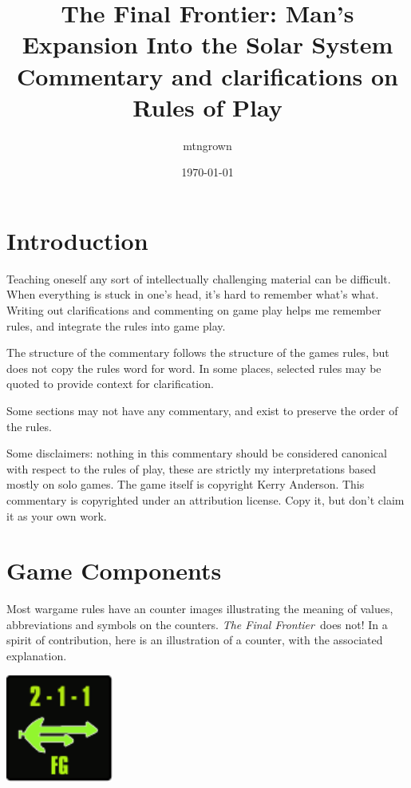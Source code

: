\documentclass[10pt]{article}
\title{The Final Frontier: Man's Expansion Into the Solar System\\
\vspace{2 mm} {\Large Commentary and clarifications on Rules of Play}}
\date{\today}
\author{mtngrown}
\def\tff{{\em The Final Frontier}}
\begin{document}
\maketitle
\tableofcontents


\begin{multicols}{2}

\section{Introduction}

Teaching oneself any sort of intellectually challenging material can be
difficult. When everything is stuck in one's head, it's hard to remember
what's what. Writing out clarifications and commenting on game play helps
me remember rules, and integrate the rules into game play.

The structure of the commentary follows the structure of the games rules,
but does not copy the rules word for word. In some places, selected rules may
be quoted to provide context for clarification.

Some sections may not have any commentary, and exist to preserve the order
of the rules.

Some disclaimers: nothing in this commentary should be considered canonical
with respect to the rules of play, these are strictly my interpretations based
mostly on solo games. The game itself is copyright Kerry Anderson. This
commentary is copyrighted under an attribution license. Copy it, but don't
claim it as your own work.


\section{Game Components}

Most wargame rules have an counter images illustrating the meaning of values,
abbreviations and symbols on the counters. \tff\ does not! In a
spirit of contribution, here is an illustration of a counter, with the associated
explanation.

\begin{center}
  \includegraphics[width=100pt]{../../source/images/final-frontier-frigate.pdf}
\end{center}


\end{multicols}
\end{document}
